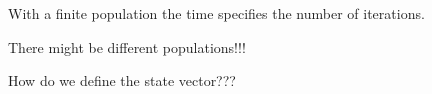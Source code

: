 \documentclass[a4paper,10pt]{article}
\begin{document}
With a finite population the time specifies the number of iterations.

There might be different populations!!!

How do we define the state vector???




\fi

\end{document}
